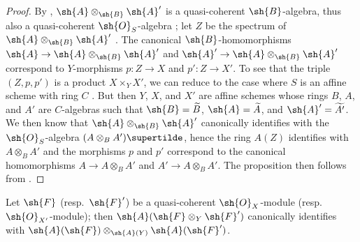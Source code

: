 \begin{proof}
By , $\sh{A}\otimes_\sh{B}\sh{A}'$ is a quasi-coherent $\sh{B}$-algebra, thus also a quasi-coherent $\sh{O}_S$-algebra ; let $Z$ be the spectrum of $\sh{A}\otimes_\sh{B}\sh{A}'$ .
The canonical $\sh{B}$-homomorphisms $\sh{A}\to\sh{A}\otimes_\sh{B}\sh{A}'$ and $\sh{A}'\to\sh{A}\otimes_\sh{B}\sh{A}'$ correspond  to $Y$-morphisms $p:Z\to X$ and $p':Z\to X'$.
To see that the triple $(Z,p,p')$ is a product $X\times_Y X'$, we can reduce to the case where $S$ is an affine scheme with ring $C$ .
But then $Y$, $X$, and $X'$ are affine schemes  whose rings $B$, $A$, and $A'$ are $C$-algebras such that $\sh{B}=\widetilde{B}$, $\sh{A}=\widetilde{A}$, and $\sh{A}'=\widetilde{A'}$.
We then know  that $\sh{A}\otimes_\sh{B}\sh{A}'$ canonically identifies with the $\sh{O}_S$-algebra $(A\otimes_B A')\supertilde$, hence the ring $A(Z)$ identifies with $A\otimes_B A'$ and the morphisms $p$ and $p'$ correspond to the canonical homomorphisms $A\to A\otimes_B A'$ and $A'\to A\otimes_B A'$.
The proposition then follows from .
\end{proof}

\begin{corollary}[1.4.7]
\label{II.1.4.7}
Let $\sh{F}$ (resp.~$\sh{F}'$) be a quasi-coherent $\sh{O}_X$-module (resp.~$\sh{O}_{X'}$-module); then $\sh{A}(\sh{F}\otimes_Y\sh{F}')$ canonically identifies with $\sh{A}(\sh{F})\otimes_{\sh{A}(Y)}\sh{A}(\sh{F}')$.
\end{corollary}

